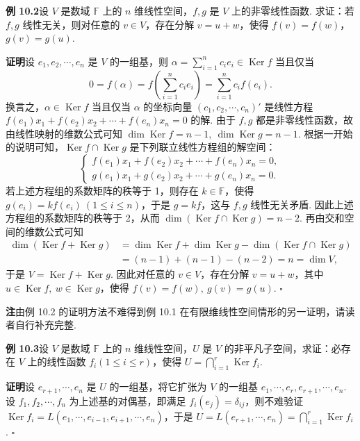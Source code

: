 \documentclass[UTF8, 12pt, fontset=fandol, oneside]{ctexart}
\begin{document}
\noindent\textbf{例 10.2}\quad 设 $V$ 是数域 $\mathbb{F}$ 上的 $n$ 维线性空间，$f,g$ 是 $V$ 上的非零线性函数. 求证：若 $f,g$ 线性无关，则对任意的 $v\in V$，存在分解 $v=u+w$，使得 $f(v)=f(w)$，$g(v)=g(u)$.

\noindent\textbf{证明}\quad 设 $e_1,e_2,\cdots,e_n$ 是 $V$ 的一组基，则 $\alpha=\sum_{i=1}^n c_ie_i\in\operatorname{Ker}f$ 当且仅当
\[
0=f(\alpha)=f\left(\sum_{i=1}^n c_ie_i\right)=\sum_{i=1}^n c_if(e_i).
\]
换言之，$\alpha\in\operatorname{Ker}f$ 当且仅当 $\alpha$ 的坐标向量 $(c_1,c_2,\cdots,c_n)'$ 是线性方程 $f(e_1)x_1+f(e_2)x_2+\cdots+f(e_n)x_n=0$ 的解. 由于 $f,g$ 都是非零线性函数，故由线性映射的维数公式可知 $\dim\operatorname{Ker}f=n-1,\ \dim\operatorname{Ker}g=n-1$. 根据一开始的说明可知，$\operatorname{Ker}f\cap\operatorname{Ker}g$ 是下列联立线性方程组的解空间：
\[
\left\{
\begin{array}{l}
f(e_1)x_1+f(e_2)x_2+\cdots+f(e_n)x_n=0,\\
g(e_1)x_1+g(e_2)x_2+\cdots+g(e_n)x_n=0.
\end{array}
\right.
\]
若上述方程组的系数矩阵的秩等于 1，则存在 $k\in\mathbb{F}$，使得 $g(e_i)=kf(e_i)\ (1\le i\le n)$，于是 $g=kf$，这与 $f,g$ 线性无关矛盾. 因此上述方程组的系数矩阵的秩等于 2，从而 $\dim(\operatorname{Ker}f\cap\operatorname{Ker}g)=n-2$. 再由交和空间的维数公式可知
\[
\begin{aligned}
\dim(\operatorname{Ker}f+\operatorname{Ker}g)
&=\dim\operatorname{Ker}f+\dim\operatorname{Ker}g-\dim(\operatorname{Ker}f\cap\operatorname{Ker}g)\\
&=(n-1)+(n-1)-(n-2)=n=\dim V,
\end{aligned}
\]
于是 $V=\operatorname{Ker}f+\operatorname{Ker}g$. 因此对任意的 $v\in V$，存在分解 $v=u+w$，其中 $u\in\operatorname{Ker}f,\ w\in\operatorname{Ker}g$，使得 $f(v)=f(w),\ g(v)=g(u)$. $\square$

\noindent\textbf{注}\quad 由例 10.2 的证明方法不难得到例 10.1 在有限维线性空间情形的另一证明，请读者自行补充完整.

\noindent\textbf{例 10.3}\quad 设 $V$ 是数域 $\mathbb{F}$ 上的 $n$ 维线性空间，$U$ 是 $V$ 的非平凡子空间，求证：必存在 $V$ 上的线性函数 $f_i(1\le i\le r)$，使得 $U=\bigcap_{i=1}^r\operatorname{Ker}f_i$.

\noindent\textbf{证明}\quad 设 $e_{r+1},\cdots,e_n$ 是 $U$ 的一组基，将它扩张为 $V$ 的一组基 $e_1,\cdots,e_r,e_{r+1},\cdots,e_n$. 设 $f_1,f_2,\cdots,f_n$ 为上述基的对偶基，即满足 $f_i(e_j)=\delta_{ij}$，则不难验证 $\operatorname{Ker}f_i=L(e_1,\cdots,e_{i-1},e_{i+1},\cdots,e_n)$，于是 $U=L(e_{r+1},\cdots,e_n)=\bigcap_{i=1}^r\operatorname{Ker}f_i$. $\square$
\end{document}
